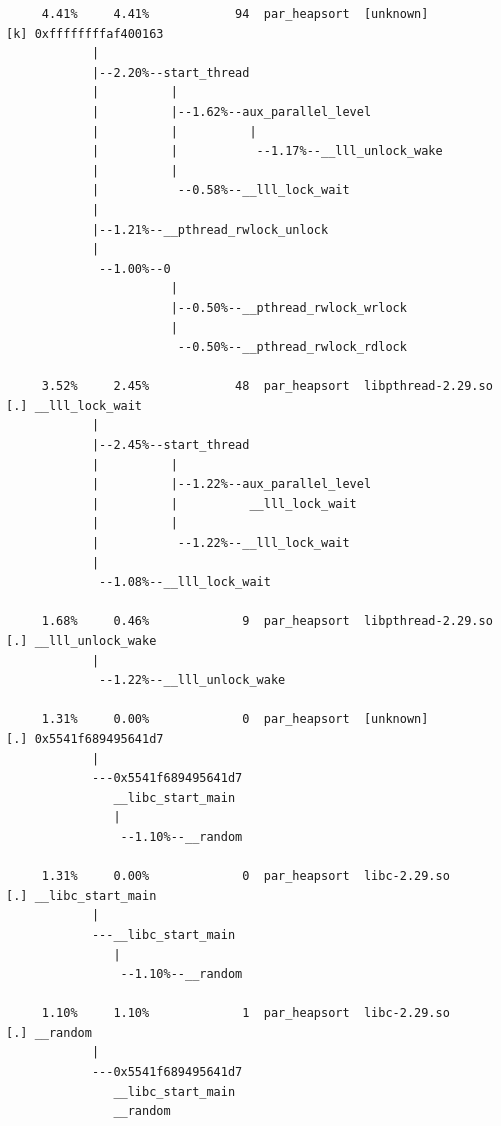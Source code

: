 \documentclass{article}
\begin{document}
\begin{verbatim}
     4.41%     4.41%            94  par_heapsort  [unknown]           [k] 0xffffffffaf400163
            |
            |--2.20%--start_thread
            |          |
            |          |--1.62%--aux_parallel_level
            |          |          |
            |          |           --1.17%--__lll_unlock_wake
            |          |
            |           --0.58%--__lll_lock_wait
            |
            |--1.21%--__pthread_rwlock_unlock
            |
             --1.00%--0
                       |
                       |--0.50%--__pthread_rwlock_wrlock
                       |
                        --0.50%--__pthread_rwlock_rdlock

     3.52%     2.45%            48  par_heapsort  libpthread-2.29.so  [.] __lll_lock_wait
            |
            |--2.45%--start_thread
            |          |
            |          |--1.22%--aux_parallel_level
            |          |          __lll_lock_wait
            |          |
            |           --1.22%--__lll_lock_wait
            |
             --1.08%--__lll_lock_wait

     1.68%     0.46%             9  par_heapsort  libpthread-2.29.so  [.] __lll_unlock_wake
            |
             --1.22%--__lll_unlock_wake

     1.31%     0.00%             0  par_heapsort  [unknown]           [.] 0x5541f689495641d7
            |
            ---0x5541f689495641d7
               __libc_start_main
               |
                --1.10%--__random

     1.31%     0.00%             0  par_heapsort  libc-2.29.so        [.] __libc_start_main
            |
            ---__libc_start_main
               |
                --1.10%--__random

     1.10%     1.10%             1  par_heapsort  libc-2.29.so        [.] __random
            |
            ---0x5541f689495641d7
               __libc_start_main
               __random


\end{verbatim}
\end{document}
